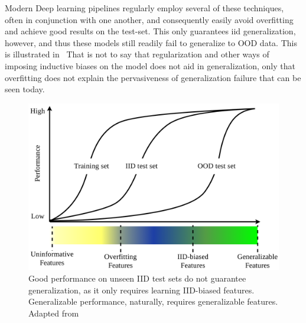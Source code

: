 	Modern Deep learning pipelines regularly employ several of these techniques, often in conjunction with one another, and consequently easily avoid overfitting and achieve good results on the test-set. This only guarantees \gls{iid} generalization, however, and thus these models still readily fail to generalize to OOD data. This is illustrated in~ That is not to say that regularization and other ways of imposing inductive biases on the model does not aid in generalization, only that overfitting does not explain the pervasiveness of generalization failure that can be seen today. 
	\begin{figure}
	    \centering
	    \includegraphics[width=\linewidth]{illustrations/features.png}
	    \caption[Feature Taxonomy]{Good performance on unseen IID test sets do not guarantee generalization, as it only requires learning IID-biased features. Generalizable performance, naturally, requires generalizable features. Adapted from~\cite{shortcut_learning}}
	    \label{fig:feature_types}
	\end{figure}

